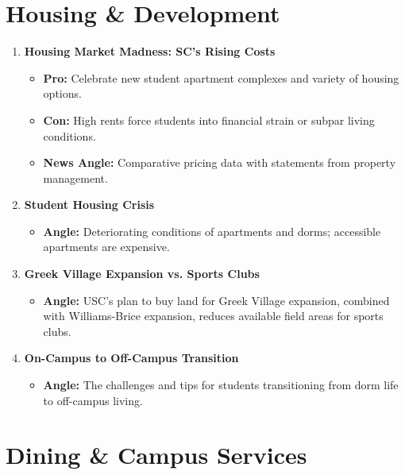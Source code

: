 \documentclass{article}
\begin{document}
\section*{Housing \& Development}

\begin{enumerate}[leftmargin=*]
    \item \textbf{Housing Market Madness: SC's Rising Costs}
    \begin{itemize}
        \item \textbf{Pro:} Celebrate new student apartment complexes and variety of housing options.
        \item \textbf{Con:} High rents force students into financial strain or subpar living conditions.
        \item \textbf{News Angle:} Comparative pricing data with statements from property management.
    \end{itemize}

    \item \textbf{Student Housing Crisis}
    \begin{itemize}
        \item \textbf{Angle:} Deteriorating conditions of apartments and dorms; accessible apartments are expensive.
    \end{itemize}

    \item \textbf{Greek Village Expansion vs. Sports Clubs}
    \begin{itemize}
        \item \textbf{Angle:} USC's plan to buy land for Greek Village expansion, combined with Williams-Brice expansion, reduces available field areas for sports clubs.
    \end{itemize}

    \item \textbf{On-Campus to Off-Campus Transition}
    \begin{itemize}
        \item \textbf{Angle:} The challenges and tips for students transitioning from dorm life to off-campus living.
    \end{itemize}
\end{enumerate}

\section*{Dining \& Campus Services}
\end{document}

